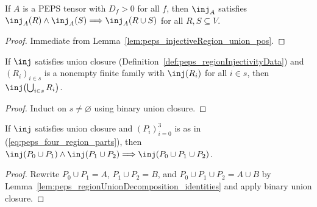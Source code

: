 \begin{lemma}%
    \label{thm:peps_regionInjectivityUnionClosure_of_overlap}
    \leanok
    If $A$ is a PEPS tensor with $D_f>0$ for all $f$, then $\inj_A$ satisfies
    $\inj_A(R)\wedge\inj_A(S)\Longrightarrow\inj_A(R\cup S)$ for all $R,S\subseteq V$.
\end{lemma}
\begin{proof}\leanok
    Immediate from Lemma~\ref{lem:peps_injectiveRegion_union_pos}.
\end{proof}

\begin{lemma}%
    \label{lem:peps_regionInjectivityUnionClosure_finite}
    \leanok
    If $\inj$ satisfies union closure
    (Definition~\ref{def:peps_regionInjectivityData}) and $(R_i)_{i\in s}$ is a
    nonempty finite family with $\inj(R_i)$ for all $i\in s$, then
    $\inj\bigl(\bigcup_{i\in s}R_i\bigr)$.
\end{lemma}
\begin{proof}\leanok
    Induct on $s\neq\varnothing$ using binary union closure.
\end{proof}

\begin{lemma}%
    \label{lem:peps_regionInjectivityUnionClosure_inside}
    \leanok
    If $\inj$ satisfies union closure and $(P_i)_{i=0}^3$ is as in
    (\ref{eq:peps_four_region_parts}), then
    $\inj(P_0\cup P_1)\wedge\inj(P_1\cup P_2)\Longrightarrow\inj(P_0\cup P_1\cup P_2)$.
\end{lemma}
\begin{proof}\leanok
    Rewrite $P_0\cup P_1=A$, $P_1\cup P_2=B$, and $P_0\cup P_1\cup P_2=A\cup B$
    by Lemma~\ref{lem:peps_regionUnionDecomposition_identities} and apply
    binary union closure.
\end{proof}
